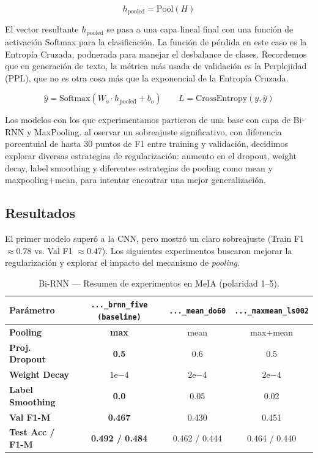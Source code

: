 \[
    h_{\text{pooled}} = \text{Pool}(H)
\]

El vector resultante $h_{\text{pooled}}$ se pasa a una capa lineal final con una función de 
activación Softmax para la clasificación. La función de pérdida en este caso es la Entropía 
Cruzada, podnerada para manejar el desbalance de clases. Recordemos que en generación de texto, 
la métrica más usada de validación es la Perplejidad (PPL), que no es otra cosa más que la exponencial
de la Entropía Cruzada. 

\[
    \hat{y} = \text{Softmax}(W_o \cdot h_{\text{pooled}} + b_o) \;\;\;\;\;\;\;  L = \text{CrossEntropy}(y, \hat{y})
\]

Los modelos con los que experimentamos partieron de una base con capa de Bi-RNN y MaxPooling. al
oservar un sobreajuste significativo, con diferencia porcentuial de hasta 30 puntos de F1 entre 
training y validación, decidimos explorar diversas estrategias de regularización: aumento en 
el dropout, weight decay, label smoothing y diferentes estrategias de pooling como mean y maxpooling+mean, 
para intentar encontrar una mejor generalización.

\subsection{Resultados}

El primer modelo superó a la CNN, pero mostró un claro sobreajuste (Train F1 $\approx 0.78$ vs. Val F1 $\approx 0.47$). Los siguientes experimentos buscaron mejorar la regularización y explorar el impacto del mecanismo de \emph{pooling}.

\begin{table}[h!]
\centering
\caption{Bi-RNN — Resumen de experimentos en MeIA (polaridad 1–5).}
\label{tab:rnn_meia_transposed}
\begin{tabular}{lccc}
\toprule
\textbf{Parámetro} & \textbf{\texttt{...\_brnn\_five (baseline)}} & \texttt{...\_mean\_do60} & \texttt{...\_maxmean\_ls002} \\
\midrule
\textbf{Pooling}           & \textbf{max}          & mean                & max+mean \\
\textbf{Proj. Dropout}     & \textbf{0.5}          & 0.6                 & 0.5 \\
\textbf{Weight Decay}      & \textbf{$1\mathrm{e}{-4}$} & $2\mathrm{e}{-4}$   & $2\mathrm{e}{-4}$ \\
\textbf{Label Smoothing}   & \textbf{0.0}          & 0.05                & 0.02 \\
\textbf{Val F1-M}          & \textbf{0.467}        & 0.430               & 0.451 \\
\textbf{Test Acc / F1-M}   & \textbf{0.492 / 0.484} & 0.462 / 0.444       & 0.464 / 0.440 \\
\bottomrule
\end{tabular}
\end{table}

